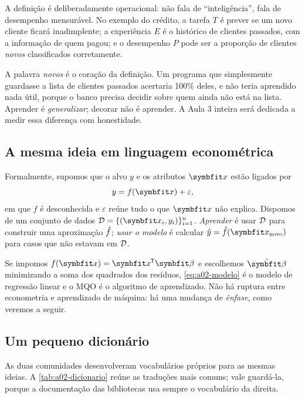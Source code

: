 A definição é deliberadamente operacional: não fala de ``inteligência'', fala de
desempenho mensurável. No exemplo do crédito, a tarefa $T$ é prever se um novo
cliente ficará inadimplente; a experiência $E$ é o histórico de clientes passados,
com a informação de quem pagou; e o desempenho $P$ pode ser a proporção de
clientes \emph{novos} classificados corretamente.

A palavra \emph{novos} é o coração da definição. Um programa que simplesmente
guardasse a lista de clientes passados acertaria 100\% deles, e não teria
aprendido nada útil, porque o banco precisa decidir sobre quem ainda não está na
lista. Aprender é \emph{generalizar}; decorar não é aprender. A Aula 3 inteira
será dedicada a medir essa diferença com honestidade.

\subsection{A mesma ideia em linguagem econométrica}

Formalmente, supomos que o alvo $y$ e os atributos $\vx$ estão ligados por
\begin{equation}\label{eq:a02-modelo}
  y = f(\vx) + \varepsilon,
\end{equation}
em que $f$ é desconhecida e $\varepsilon$ reúne tudo o que $\vx$ não explica.
Dispomos de um conjunto de dados $\data = \{(\vx_i, y_i)\}_{i=1}^{n}$.
\emph{Aprender} é usar $\mathcal{D}$ para construir uma aproximação $\hat{f}$;
\emph{usar o modelo} é calcular $\hat y = \hf(\vx_{\text{novo}})$ para casos
que não estavam em $\mathcal{D}$.

\begin{conexao}
Se impomos $f(\vx) = \vx\T\vbeta$ e escolhemos $\hvbeta$ minimizando a soma
dos quadrados dos resíduos, \cref{eq:a02-modelo} é o modelo de regressão linear
e o MQO é o algoritmo de aprendizado. Não há ruptura entre econometria e
aprendizado de máquina: há uma mudança de \emph{ênfase}, como veremos a seguir.
\end{conexao}

\subsection{Um pequeno dicionário}

As duas comunidades desenvolveram vocabulários próprios para as mesmas ideias.
A \cref{tab:a02-dicionario} reúne as traduções mais comuns; vale guardá-la, porque
a documentação das bibliotecas usa sempre o vocabulário da direita.

